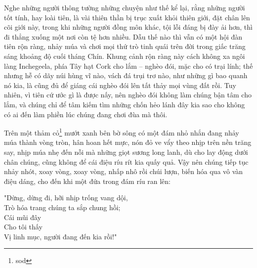 Nghe những người thông tường những chuyện như thế kể lại, rằng những người tốt tính, hay loài tiên, là vài thiên thần bị trục xuất khỏi thiên giới, đặt chân lên cõi giới này, trong khi những người đồng môn khác, tội lỗi đáng bị đày ải hơn, thì đi thẳng xuống một nơi còn tệ hơn nhiều. Dẫu thế nào thì vẫn có một hội đàn tiên rộn ràng, nhảy múa và chơi mọi thứ trò tinh quái trên đời trong giấc trăng sáng khoảng độ cuối tháng Chín. Khung cảnh rộn ràng này cách không xa ngôi làng Inchegeela, phía Tây hạt Cork cho lắm – nghèo đói, mặc cho có trại lính; thế nhưng hễ có dãy núi hùng vĩ nào, vách đá trụi trơ nào, như những gì bao quanh nó kia, là cũng đủ để giáng cái nghèo đói lên tất thảy mọi vùng đất rồi. Tuy nhiên, vì tiên cứ ước gì là được nấy, nên nghèo đói không làm chúng bận tâm cho lắm, và chúng chỉ để tâm kiếm tìm những chốn hẻo lánh đây kia sao cho không có ai đến làm phiền lúc chúng đang chơi đùa mà thôi.

Trên một thảm cỏ\footnote{sod} mướt xanh bên bờ sông có một đám nhỏ nhắn đang nhảy múa thành vòng tròn, hân hoan hết mực, nón đỏ ve vẩy theo nhịp trên nền trăng say, nhịp múa nhẹ đến nỗi mà những giọt sương long lanh, dù cho lay động dưới chân chúng, cũng không để cái điệu ríu rít kia quấy quả. Vậy nên chúng tiếp tục nhảy nhót, xoay vòng, xoay vòng, nhấp nhô rồi chúi lượn, biến hóa qua vô vàn điệu dáng, cho đến khi một đứa trong đám ríu ran lên:

\begin{center}
  "Dừng, dừng đi, hỡi nhịp trống vang dội,\\
  Trò hóa trang chúng ta sắp chung hồi;\\
  Cái mũi đây\\
  Cho tôi thấy\\
  Vị linh mục, người đang đến kia rồi!"\\
\end{center}
